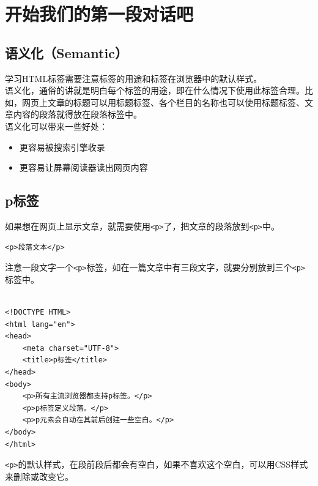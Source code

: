 \section{开始我们的第一段对话吧}

\subsection{语义化（Semantic）}

学习HTML标签需要注意标签的用途和标签在浏览器中的默认样式。 \\

语义化，通俗的讲就是明白每个标签的用途，即在什么情况下使用此标签合理。比如，网页上文章的标题可以用标题标签、各个栏目的名称也可以使用标题标签、文章内容的段落就得放在段落标签中。 \\

语义化可以带来一些好处：

\begin{itemize}
    \item 更容易被搜索引擎收录
    \item 更容易让屏幕阅读器读出网页内容
\end{itemize}

\subsection{p标签}

如果想在网页上显示文章，就需要使用\lstinline|<p>|了，把文章的段落放到\lstinline|<p>|中。 \\

\begin{lstlisting}[style=htmlcssjs]
<p>段落文本</p>
\end{lstlisting}

注意一段文字一个\lstinline|<p>|标签，如在一篇文章中有三段文字，就要分别放到三个\lstinline|<p>|标签中。 \\

 \\
\begin{lstlisting}[style=htmlcssjs]
<!DOCTYPE HTML>
<html lang="en">
<head>
    <meta charset="UTF-8">
    <title>p标签</title>
</head>
<body>
    <p>所有主流浏览器都支持p标签。</p>
    <p>p标签定义段落。</p>
    <p>p元素会自动在其前后创建一些空白。</p>
</body>
</html>
\end{lstlisting}

\lstinline|<p>|的默认样式，在段前段后都会有空白，如果不喜欢这个空白，可以用CSS样式来删除或改变它。

